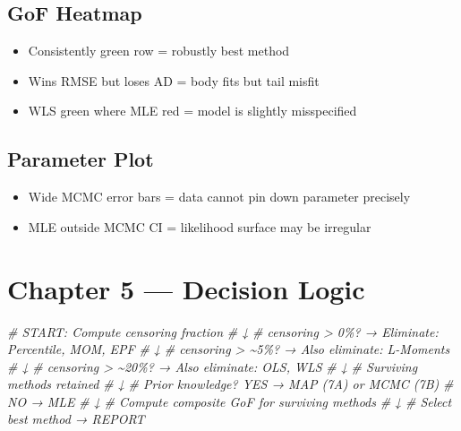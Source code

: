 \documentclass[
]{article}
\newenvironment{Shaded}{\begin{snugshade}}{\end{snugshade}}
\newcommand{\CommentTok}[1]{\textcolor[rgb]{0.56,0.35,0.01}{\textit{#1}}}
\providecommand{\tightlist}{%
  \setlength{\itemsep}{0pt}\setlength{\parskip}{0pt}}
\begin{document}
\subsection{GoF Heatmap}\label{gof-heatmap}

\begin{itemize}
\tightlist
\item
  Consistently green row = robustly best method
\item
  Wins RMSE but loses AD = body fits but tail misfit
\item
  WLS green where MLE red = model is slightly misspecified
\end{itemize}

\subsection{Parameter Plot}\label{parameter-plot}

\begin{itemize}
\tightlist
\item
  Wide MCMC error bars = data cannot pin down parameter precisely
\item
  MLE outside MCMC CI = likelihood surface may be irregular
\end{itemize}

\newpage

\section{Chapter 5 --- Decision Logic}\label{chapter-5-decision-logic}

\begin{Shaded}
\begin{Highlighting}[]
\CommentTok{\#  START: Compute censoring fraction}
\CommentTok{\#    ↓}
\CommentTok{\#  censoring \textgreater{} 0\%? → Eliminate: Percentile, MOM, EPF}
\CommentTok{\#    ↓}
\CommentTok{\#  censoring \textgreater{} \textasciitilde{}5\%? → Also eliminate: L{-}Moments}
\CommentTok{\#    ↓  }
\CommentTok{\#  censoring \textgreater{} \textasciitilde{}20\%? → Also eliminate: OLS, WLS}
\CommentTok{\#    ↓}
\CommentTok{\#  Surviving methods retained}
\CommentTok{\#    ↓}
\CommentTok{\#  Prior knowledge? YES → MAP (7A) or MCMC (7B)}
\CommentTok{\#                   NO  → MLE}
\CommentTok{\#    ↓}
\CommentTok{\#  Compute composite GoF for surviving methods}
\CommentTok{\#    ↓}
\CommentTok{\#  Select best method → REPORT}
\end{Highlighting}
\end{Shaded}
\end{document}
